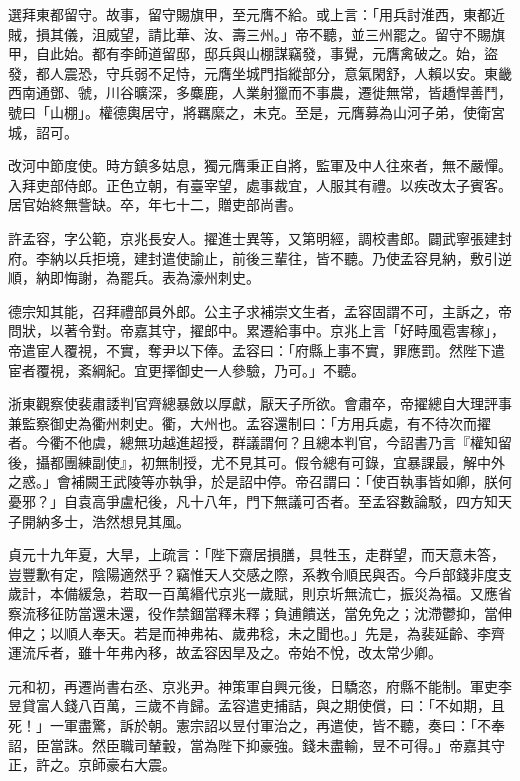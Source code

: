 \begin{pinyinscope}
 選拜東都留守。故事，留守賜旗甲，至元膺不給。或上言：「用兵討淮西，東都近賊，損其儀，沮威望，請比華、汝、壽三州。」帝不聽，並三州罷之。留守不賜旗甲，自此始。都有李師道留邸，邸兵與山棚謀竊發，事覺，元膺禽破之。始，盜發，都人震恐，守兵弱不足恃，元膺坐城門指縱部分，意氣閑舒，人賴以安。東畿西南通鄧、虢，川谷曠深，多麋鹿，人業射獵而不事農，遷徙無常，皆趫悍善鬥，號曰「山棚」。權德輿居守，將羈縻之，未克。至是，元膺募為山河子弟，使衛宮城，詔可。



 改河中節度使。時方鎮多姑息，獨元膺秉正自將，監軍及中人往來者，無不嚴憚。入拜吏部侍郎。正色立朝，有臺宰望，處事裁宜，人服其有禮。以疾改太子賓客。居官始終無訾缺。卒，年七十二，贈吏部尚書。



 許孟容，字公範，京兆長安人。擢進士異等，又第明經，調校書郎。闢武寧張建封府。李納以兵拒境，建封遣使諭止，前後三輩往，皆不聽。乃使孟容見納，敷引逆順，納即悔謝，為罷兵。表為濠州刺史。



 德宗知其能，召拜禮部員外郎。公主子求補崇文生者，孟容固謂不可，主訴之，帝問狀，以著令對。帝嘉其守，擢郎中。累遷給事中。京兆上言「好畤風雹害稼」，帝遣宦人覆視，不實，奪尹以下俸。孟容曰：「府縣上事不實，罪應罰。然陛下遣宦者覆視，紊綱紀。宜更擇御史一人參驗，乃可。」不聽。



 浙東觀察使裴肅諉判官齊總暴斂以厚獻，厭天子所欲。會肅卒，帝擢總自大理評事兼監察御史為衢州刺史。衢，大州也。孟容還制曰：「方用兵處，有不待次而擢者。今衢不他虞，總無功越進超授，群議謂何？且總本判官，今詔書乃言『權知留後，攝都團練副使』，初無制授，尤不見其可。假令總有可錄，宜暴課最，解中外之惑。」會補闕王武陵等亦執爭，於是詔中停。帝召謂曰：「使百執事皆如卿，朕何憂邪？」自袁高爭盧杞後，凡十八年，門下無議可否者。至孟容數論駁，四方知天子開納多士，浩然想見其風。



 貞元十九年夏，大旱，上疏言：「陛下齋居損膳，具牲玉，走群望，而天意未答，豈豐歉有定，陰陽適然乎？竊惟天人交感之際，系教令順民與否。今戶部錢非度支歲計，本備緩急，若取一百萬緡代京兆一歲賦，則京圻無流亡，振災為福。又應省察流移征防當還未還，役作禁錮當釋未釋；負逋饋送，當免免之；沈滯鬱抑，當伸伸之；以順人奉天。若是而神弗祐、歲弗稔，未之聞也。」先是，為裴延齡、李齊運流斥者，雖十年弗內移，故孟容因旱及之。帝始不悅，改太常少卿。



 元和初，再遷尚書右丞、京兆尹。神策軍自興元後，日驕恣，府縣不能制。軍吏李昱貸富人錢八百萬，三歲不肯歸。孟容遣吏捕詰，與之期使償，曰：「不如期，且死！」一軍盡驚，訴於朝。憲宗詔以昱付軍治之，再遣使，皆不聽，奏曰：「不奉詔，臣當誅。然臣職司輦轂，當為陛下抑豪強。錢未盡輸，昱不可得。」帝嘉其守正，許之。京師豪右大震。




\end{pinyinscope}
